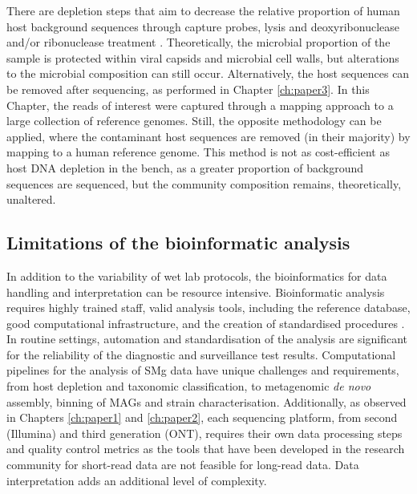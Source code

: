 There are depletion steps that aim to decrease the relative proportion of human host background sequences through capture probes, lysis and deoxyribonuclease and/or ribonuclease treatment \citep{gu_clinical_2019}. Theoretically, the microbial proportion of the sample is protected within viral capsids and microbial cell walls, but alterations to the microbial composition can still occur. Alternatively, the host sequences can be removed after sequencing, as performed in Chapter \ref{ch:paper3}. In this Chapter, the reads of interest were captured through a mapping approach to a large collection of reference genomes. Still, the opposite methodology can be applied, where the contaminant host sequences are removed (in their majority) by mapping to a human reference genome. This method is not as cost-efficient as host DNA depletion in the bench, as a greater proportion of background sequences are sequenced, but the community composition remains, theoretically, unaltered. 

\subsection{Limitations of the bioinformatic analysis}

In addition to the variability of wet lab protocols, the bioinformatics for data handling and interpretation can be resource intensive. Bioinformatic analysis requires highly trained staff, valid analysis tools, including the reference database, good computational infrastructure, and the creation of standardised procedures \citep{petersen_third-generation_2019}. In routine settings, automation and standardisation of the analysis are significant for the reliability of the diagnostic and surveillance test results. Computational pipelines for the analysis of \ac{SMg} data have unique challenges and requirements, from host depletion and taxonomic classification, to metagenomic \textit{de novo} assembly, binning of \ac{MAG}s and strain characterisation. Additionally, as observed in Chapters \ref{ch:paper1} and \ref{ch:paper2}, each sequencing platform, from second (Illumina) and third generation (\ac{ONT}), requires their own data processing steps and quality control metrics as the tools that have been developed in the research community for short-read data are not feasible for long-read data. Data interpretation adds an additional level of complexity.  

